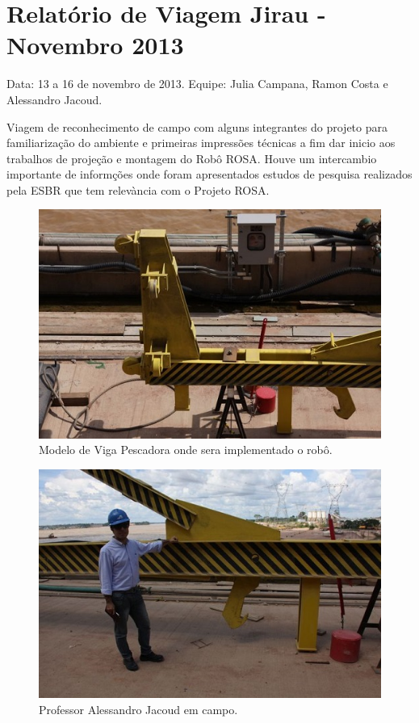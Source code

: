 \section{Relatório de Viagem Jirau - Novembro 2013}
Data: 13 a 16 de novembro de 2013.
Equipe: Julia Campana, Ramon Costa e Alessandro Jacoud.


Viagem de reconhecimento de campo com alguns integrantes do projeto para
familiarização do ambiente e primeiras impressões técnicas a fim dar inicio aos
trabalhos de projeção e montagem do Robô ROSA. Houve um intercambio importante
de informções onde foram apresentados estudos de pesquisa realizados pela ESBR
que tem relevància com o Projeto ROSA.



\begin{figure}[h!]
\centering
  \includegraphics[width=1\linewidth]{Fotos/Novembro2013/1.jpg}
  \caption{Modelo de Viga Pescadora onde sera implementado o robô.}
  \label{nov20131}
\end{figure}

\begin{figure}[h!]
  \centering
  \includegraphics[width=1\linewidth]{Fotos/Novembro2013/2.jpg}
  \caption{Professor Alessandro Jacoud em campo.}
  \label{nov20132}
\end{figure}

